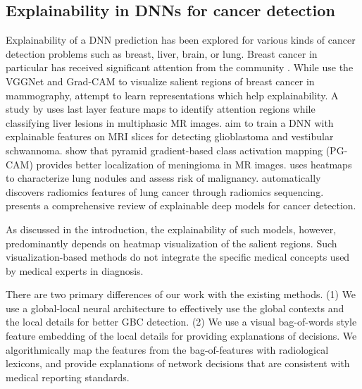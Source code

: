 \documentclass[twocolumn,final]{elsarticle}
\begin{document}
\subsection{Explainability in DNNs for cancer detection}
%
Explainability of a DNN prediction has been explored for various kinds of cancer detection problems such as breast, liver, brain, or lung. Breast cancer in particular has received significant attention from the community \citep{dhungel2016automated, zhou2018radiomics, samala2018breast}. While \cite{wang2018breast} use the VGGNet and Grad-CAM to visualize salient regions of breast cancer in mammography, \cite{wu2018deepminer} attempt to learn representations which help explainability. A study by \cite{hamm2019deep} uses last layer feature maps to identify attention regions while classifying liver lesions in multiphasic MR images.  \cite{windisch2020implementation} aim to train a DNN with explainable features on MRI slices for detecting glioblastoma and vestibular schwannoma. \cite{pg-cam} show that pyramid gradient-based class activation mapping (PG-CAM) provides better localization of meningioma in MR images. \cite{venugopal2020unboxing} uses heatmaps to characterize lung nodules and assess risk of malignancy. \cite{kumar2019sisc} automatically discovers radiomics features of lung cancer through radiomics sequencing. \cite{gulum2021review} presents a comprehensive review of explainable deep models for cancer detection.
\par As discussed in the introduction, the explainability of such models, however, predominantly depends on heatmap visualization of the salient regions. Such visualization-based methods do not integrate the specific medical concepts used by medical experts in diagnosis.
\par There are two primary differences of our work with the existing methods. (1) We use a global-local neural architecture to effectively use the global contexts and the local details for better GBC detection. (2) We use a visual bag-of-words style feature embedding of the local details for providing explanations of decisions. We algorithmically map the features from the bag-of-features with radiological lexicons, and provide explanations of network decisions that are consistent with medical reporting standards.
\end{document}
